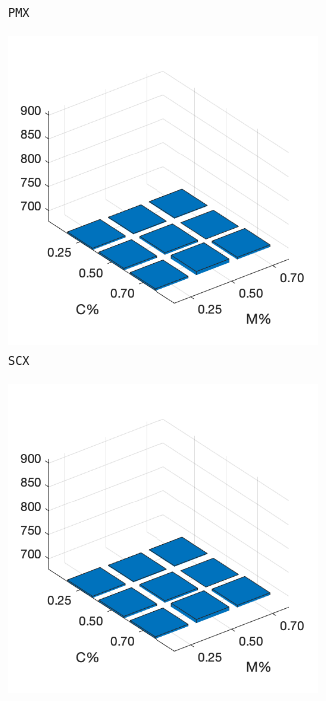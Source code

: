 \begin{figure}
\begin{subfigure}[b]{0.25\textwidth}
		\caption{\texttt{PMX}}
		\label{fig:z}
    	\end{subfigure}
%
	\begin{subfigure}[b]{0.25\textwidth}
		\centering
		\includegraphics[width=0.9\textwidth]{crossover/cross_unnamed_1.png}
		\caption{\texttt{SCX}}
		\label{fig:x}
    	\end{subfigure}
%
	\begin{subfigure}[b]{0.25\textwidth}
		\centering
		\includegraphics[width=0.9\textwidth]{crossover/cross_unnamed_1.png}

\end{subfigure}
\end{figure}

